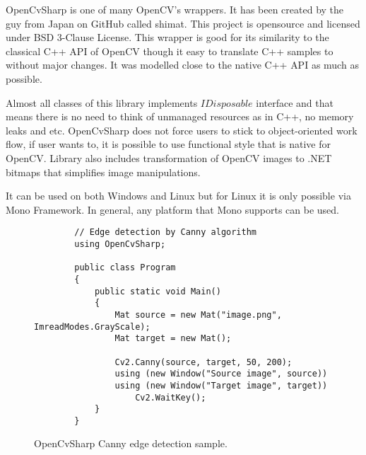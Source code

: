 \documentclass[../../../../main]{subfiles}
\begin{document}
OpenCvSharp is one of many {\Csharp} OpenCV's wrappers. It has been created by the guy from Japan on GitHub called shimat. This project is opensource and licensed under BSD 3-Clause License. This wrapper is good for its similarity to the classical C++ \ac{API} of \ac{OpenCV} though it easy to translate C++ samples to {\Csharp} without major changes. It was modelled close to the native C++ \ac{API} as much as possible.

Almost all classes of this library implements $IDisposable$ interface and that means there is no need to think of unmanaged resources as in C++, no memory leaks and etc. OpenCvSharp does not force users to stick to object-oriented work flow, if user wants to, it is possible to use functional style that is native for \ac{OpenCV}. Library also includes transformation of \ac{OpenCV} images to .NET bitmaps that simplifies image manipulations.

It can be used on both Windows and Linux but for Linux it is only possible via Mono Framework. In general, any platform that Mono supports can be used.

\begin{figure} [!ht]
  \centering    
    \lstset{style=sharpc}
        \begin{lstlisting}
        // Edge detection by Canny algorithm
        using OpenCvSharp;
        
        public class Program 
        {
            public static void Main() 
            {
                Mat source = new Mat("image.png", ImreadModes.GrayScale);
                Mat target = new Mat();
                
                Cv2.Canny(source, target, 50, 200);
                using (new Window("Source image", source)) 
                using (new Window("Target image", target)) 
                    Cv2.WaitKey();
            }
        }
        \end{lstlisting}
  \caption{OpenCvSharp Canny edge detection sample.}
  \label{opencvsharpcanny}
\end{figure}
\end{document}
